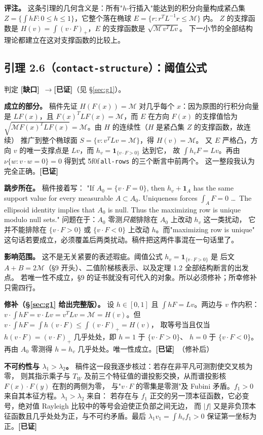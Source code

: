 \documentclass[UTF8,11pt]{ctexart}
\theoremstyle{definition}
\newcommand{\peq}[1]{\textup{\u5f0f}\,\texttt{#1}}
\newcommand{\ok}{\textcolor[rgb]{0.05,0.45,0.15}{\bfseries [已证]}}
\newcommand{\gap}{\textcolor[rgb]{0.70,0.15,0.10}{\bfseries [缺口]}}
\begin{document}
\textbf{评注。} 这条引理的几何含义是：所有"$h$-行插入"能达到的积分向量构成紧凸集
$Z=\{\int hF:0\le h\le1\}$，它整个落在椭球 $E=\{r:r^TL^{-1}r\le\mathcal M\}$ 内。
$Z$ 的支撑函数是 $H(v)=\int(v\cdot F)_+$，$E$ 的支撑函数是 $\sqrt{\mathcal M\,v^TLv}$。
下一小节的全部结构理论都建立在这对支撑函数的比较上。

\subsection{引理 2.6（\texttt{contact-structure}）：阈值公式}\label{sec:cs}

判定 \gap\ $\to$\ok（见 \S\ref{sec:g1}）。

\textbf{成立的部分。} 稿件先证 $H(F(x))=\mathcal M$ 对几乎每个 $x$：因为原图的行积分向量是
$LF(x)$，且 $F(x)^TLF(x)=\mathcal M$，而 $E$ 在方向 $F(x)$ 的支撑值恰为
$\sqrt{\mathcal M F(x)^TLF(x)}=\mathcal M$。由 $H$ 的连续性（$H$ 是紧凸集 $Z$ 的支撑函数，故连续）
推广到整个椭球面 $S=\{v:v^TLv=\mathcal M\}$，得 $H(v)=\mathcal M$。
又 $E$ 严格凸，方向 $v$ 的唯一支撑点是 $Lv$，而 $h_v=\mathbf1_{\{v\cdot F>0\}}$ 达到它，
故 $\int h_vF=Lv$。再由 $\nu\{w:v\cdot w=0\}=0$ 得到式 \peq{all-rows} 的三个断言中前两个。
这一整段我认为完全正确。\hfill\ok

\textbf{跳步所在。} 稿件接着写：
"If $A_0=\{v\cdot F=0\}$, then $h_v+\mathbf1_A$ has the same support value for every measurable
$A\subset A_0$. Uniqueness forces $\int_AF=0$ \dots\ The ellipsoid identity implies that $A_0$
is null. Thus the maximizing row is unique modulo null sets."
问题在于：$A_0$ 零测\emph{只能}排除在 $A_0$ 上改动 $h_v$ 这一类扰动，
它并不能排除在 $\{v\cdot F>0\}$ 或 $\{v\cdot F<0\}$ 上改动 $h$。而"maximizing row is unique"
这句话若要成立，必须覆盖后两类扰动。稿件把这两件事混在一句话里了。

\textbf{影响范围。} 这不是无关紧要的表述瑕疵。阈值公式 $h_v=\mathbf1_{\{v\cdot F>0\}}$ 是
后文 $A+B=2\mathcal M$（\S9 开头）、二值阶梯核表示、以及定理 1.2 全部结构断言的出发点。
若唯一性不成立，\S9 的证书就没有可代入的对象。所以必须修补；所幸修补只需四行。

\textbf{修补（\S\ref{sec:g1} 给出完整版）。} 设 $h\in[0,1]$ 且 $\int hF=Lv$。两边与 $v$ 作内积：
$v\cdot\int hF=v\cdot Lv=v^TLv=\mathcal M=H(v)$。但
$v\cdot\int hF=\int h\,(v\cdot F)\le\int(v\cdot F)_+=H(v)$，
取等号当且仅当 $h(v\cdot F)=(v\cdot F)_+$ 几乎处处，即 $h=1$ 于 $\{v\cdot F>0\}$、
$h=0$ 于 $\{v\cdot F<0\}$。再由 $A_0$ 零测得 $h=h_v$ 几乎处处。唯一性成立。\hfill\ok\ （修补后）

\textbf{不可约性与 $\lambda_1>\lambda_2$。} 稿件这一段我逐步核过：若存在非平凡可测割使交叉核为零，
则其指示乘子与 $T_W$ 及前三个特征值的谱投影交换，从而谱投影核 $F(x)\cdot F(y)$ 在割的两侧为零，
与"$v\cdot F$ 的零集是零测"及 Fubini 矛盾。$f_1>0$ 来自其本征方程。$\lambda_1>\lambda_2$ 来自：
若存在与 $f_1$ 正交的另一顶本征函数，它必变号，绝对值 Rayleigh 比较中的等号会迫使正负部之间无边，
而 $|f|$ 又是非负顶本征函数且几乎处处为正，与不可约矛盾。最后
$\lambda_1v_1=\int h_vf_1>0$ 保证第一坐标为正。\hfill\ok
\end{document}
